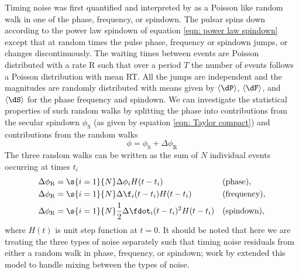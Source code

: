 Timing noise was first quantified and interpreted by \citet{Boynton1972} as a
Poisson like random walk in one of the phase, frequency, or spindown. The
pulsar spins down according to the power law spindown of equation \eqref{eqn:
power law spindown} except that at random times the pulse phase, frequency or
spindown jumps, or changes discontinuously. The waiting times between events
are Poisson distributed with a rate R such that over a period $T$ the number of
events follows a Poisson distribution with mean RT. All the jumps are
independent and the magnitudes are randomly distributed with means given by
$\langle\dP\rangle$, $\langle\dF\rangle$, and $\langle\dS\rangle$ for the phase
frequency and spindown. We can investigate the statistical properties of such
random walks by splitting the phase into contributions from the secular
spindown $\phi_{\mathrm{S}}$ (as given by equation \eqref{eqn: Taylor compact})
and contributions from the random walks
\begin{equation}
    \phi = \phi_{\mathrm{S}} + \Delta\phi_{\mathrm{R}}
\end{equation}
The three random walks can be written as the sum of $N$ individual events
occurring at times $t_{i}$
\begin{align}
    \Delta\phi_{\mathrm{R}} & = \s{i=1}{N}\Delta\phi_{i} H(t - t_{i}) 
     && \mathrm{(phase),} \\
    \Delta\phi_{\mathrm{R}} & = \s{i=1}{N}\Delta\f_{i} (t-t_{i})H(t - t_{i}) 
     && \mathrm{(frequency),} \\
    \Delta\phi_{\mathrm{R}} & = \s{i=1}{N}\frac{1}{2}\Delta\fdot_{i} (t-t_{i})^{2}H(t - t_{i}) 
     && \mathrm{(spindown),}
\end{align}
where $H(t)$ is unit step function at $t=0$. It should be noted that here we are
treating the three types of noise separately such that timing noise residuals 
from either a random walk in phase, frequency, or spindown; work by \citet{Cordes1980}
extended this model to handle mixing between the types of noise.

